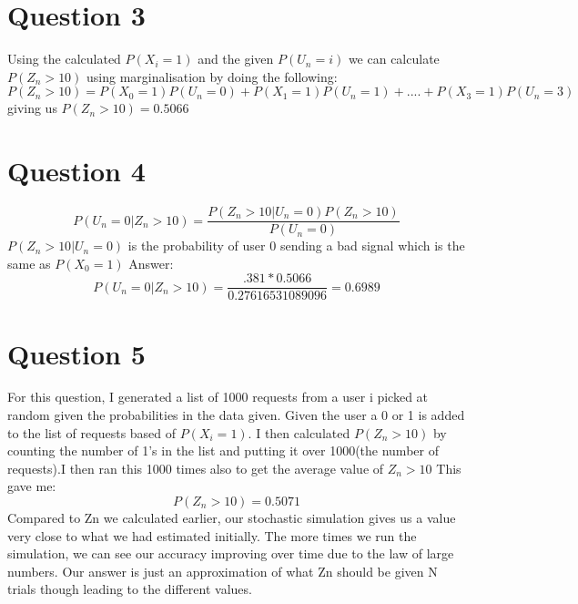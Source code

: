 \documentclass[11pt]{article} %
\begin{document}
\section{Question 3}
Using the calculated \(P(X_i = 1)\) and the given \(P(U_n = i)\) we can calculate \(P(Z_n >10)\) using marginalisation by doing the following:
\[P(Z_n >10) = P(X_0 = 1)P(U_n = 0) + P(X_1 = 1)P(U_n=1) + ....+P(X_3 = 1)P(U_n=3)\]
giving us \(P(Z_n >10) = 0.5066 \)

\section{Question 4}
\[P(U_n = 0 | Z_n >10) = \frac{P(Z_n>10|U_n = 0)P(Z_n>10)}{P(U_n=0)}\]
\(P(Z_n>10|U_n = 0)\) is the probability of user 0 sending a bad signal which is the same as \( P(X_0 = 1)\)
Answer:
\[P(U_n = 0 | Z_n >10) = \frac{.381*0.5066}{0.27616531089096} = 0.6989\] 
\section{Question 5}
For this question, I generated a list of 1000 requests from a user i picked at random given the probabilities in the data given. Given the user a 0 or 1 is added to the list of requests based of \(P(X_i = 1) \). I then calculated  \(P(Z_n>10)\) by counting the number of 1's in the list and putting it over 1000(the number of requests).I then ran this 1000 times also to get the average value of \( Z_n >10\) This gave me:
\[P(Z_n>10) = 0.5071\]
Compared to Zn we calculated earlier, our stochastic simulation gives us a value very close to what we had estimated initially. The more times we run the simulation, we can see our accuracy improving over time due to the law of large numbers. Our answer is just an approximation of what Zn should be given N trials though leading to the different values.
\end{document}
